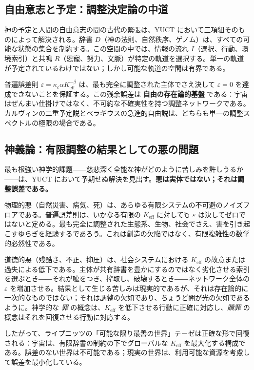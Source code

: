 \documentclass[12pt,a4paper]{article}
\begin{document}
	\subsection{自由意志と予定：調整決定論の中道}
	
	神の予定と人間の自由意志の間の古代の緊張は、YUCT において三項組そのものによって解決される。辞書 \(D\)（神の法則、自然秩序、ゲノム）は、すべての可能な状態の集合を制約する。この空間の中では、情報の流れ \(I\)（選択、行動、環境索引）と共鳴 \(R\)（恩寵、努力、文脈）が特定の軌道を選択する。単一の軌道が予定されているわけではない；しかし可能な軌道の空間は有界である。
	
	普遍誤差則 \(\varepsilon = \kappa_c \alpha K_{\mathrm{eff}}^{-\beta}\) は、最も完全に調整された主体でさえ決して \(\varepsilon = 0\) を達成できないことを保証する。この残余誤差は \textbf{自由の存在論的基盤} である：宇宙はぜんまい仕掛けではなく、不可約な不確実性を持つ調整ネットワークである。カルヴィンの二重予定説とペラギウスの急進的自由説は、どちらも単一の調整スペクトルの極限の場合である。
	
	\subsection{神義論：有限調整の結果としての悪の問題}
	
	最も根強い神学的課題――慈悲深く全能な神がどのように苦しみを許しうるか――は、YUCT において予期せぬ解決を見出す。\textbf{悪は実体ではない；それは調整誤差である。}
	
	物理的悪（自然災害、病気、死）は、あらゆる有限システムの不可避のノイズフロアである。普遍誤差則は、いかなる有限の \(K_{\mathrm{eff}}\) に対しても \(\varepsilon\) は決してゼロではないと定める。最も完全に調整された生態系、生物、社会でさえ、害を引き起こすゆらぎを経験するであろう。これは創造の欠陥ではなく、有限複雑性の数学的必然性である。
	
	道徳的悪（残酷さ、不正、抑圧）は、社会システムにおける \(K_{\mathrm{eff}}\) の故意または過失による低下である。主体が共有辞書を豊かにするのではなく劣化させる索引を選ぶとき――それが嘘をつき、搾取し、破壊するとき――ネットワーク全体の \(\varepsilon\) を増加させる。結果として生じる苦しみは現実的であるが、それは存在論的に一次的なものではない；それは調整の欠如であり、ちょうど闇が光の欠如であるように。神学的な \emph{罪} の概念は、\(K_{\mathrm{eff}}\) を低下させる行動に正確に対応し、\emph{贖罪} の概念はそれを回復させる行動に対応する。
	
	したがって、ライプニッツの「可能な限り最善の世界」テーゼは正確な形で回復される：宇宙は、有限辞書の制約の下でグローバルな \(K_{\mathrm{eff}}\) を最大化する構成である。誤差のない世界は不可能である；現実の世界は、利用可能な資源を考慮して誤差を最小化している。
	
\end{document}
